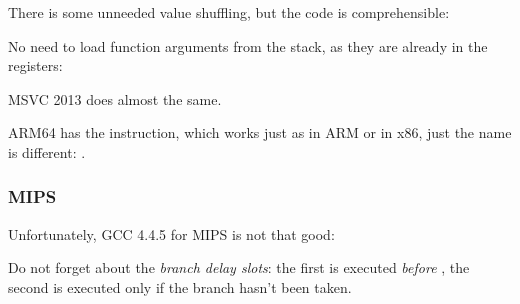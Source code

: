

There is some unneeded value shuffling, but the code is comprehensible:




No need to load function arguments from the stack, as they are already in the registers:



MSVC 2013 does almost the same.


ARM64 has the  instruction, which works just as  in ARM or  in x86, just the name is different:
.



\subsubsection{MIPS}

Unfortunately, GCC 4.4.5 for MIPS is not that good:



Do not forget about the \emph{branch delay slots}: the first  is executed \emph{before} , 
the second  is executed only if the branch hasn't been taken.

